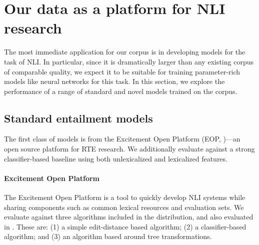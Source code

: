 \section{Our data as a platform for NLI research}

The most immediate application for our corpus is in developing models for the task of NLI. In particular, since it is dramatically larger than any existing corpus of comparable quality, we expect it to be suitable for training  parameter-rich models like neural networks for this task. In this section, we explore the performance of a range of standard and novel models trained on the corpus.

\subsection{Standard entailment models}

The first class of models is from the Excitement Open
  Platform (EOP,
  \citealt{pado2014design,magnini2014excitement})---an open source platform for RTE research.
We additionally evaluate against a strong classifier-based baseline using
  both unlexicalized and lexicalized features.

%
%
\paragraph{Excitement Open Platform}
The Excitement Open Platform is a tool to quickly develop NLI systems
  while sharing components such as common lexical resources and 
  evaluation sets.
We evaluate against three algorithms included in the distribution,
  and also evaluated in .
These are: 
  (1) a simple edit-distance based algorithm;
  (2) a classifier-based algorithm; and
  (3) an algorithm based around tree transformations.

